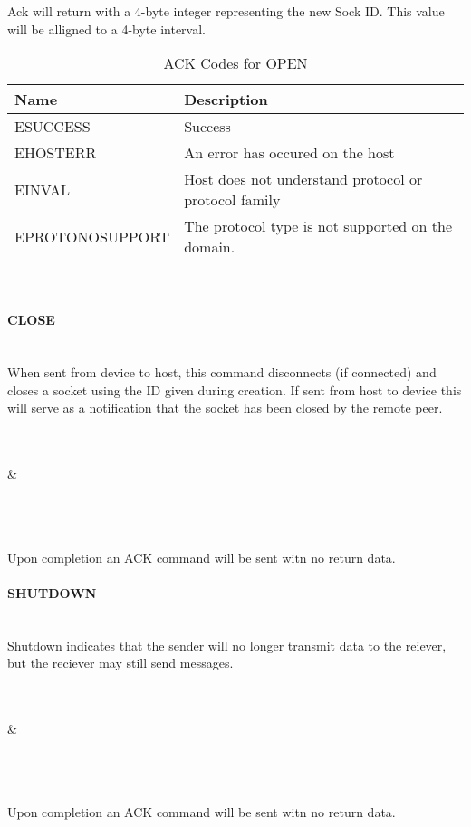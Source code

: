 \documentclass[10pt]{article}
\begin{document}
	Ack will return with a 4-byte integer representing the new Sock ID. This value will be alligned to a 4-byte interval. 
	\begin{table}[H]
		\begin{center}
			\caption{ACK Codes for OPEN}
			\label{tab:openErrTable}
			\begin{tabular}{l|l} 
				\rowcolor{lightgray}
				\textbf{Name} & \textbf{Description}\\
				\hline
				ESUCCESS & Success\\
				EHOSTERR & An error has occured on the host\\
				EINVAL & Host does not understand protocol or protocol family\\
				EPROTONOSUPPORT & The protocol type is not supported on the domain. \\
			\end{tabular}
		\end{center}
	\end{table} \mbox{}\\
	\paragraph{CLOSE} \mbox{}\\
	When sent from device to host, this command disconnects (if connected) and closes a socket using the ID given during creation.
	If sent from host to device this will serve as a notification that the socket has been closed by the remote peer. \\
	\\
	\begin{bytefield}[bitwidth=1.7em]{32}
		 \\
		 &
		 \\
		 \\
		 \\
	\end{bytefield}\\
	Upon completion an ACK command will be sent witn no return data. 
	\\
	\paragraph{SHUTDOWN} \mbox{}\\
	Shutdown indicates that the sender will no longer transmit data to the reiever, but the reciever may still send messages.\\
	\\
	\begin{bytefield}[bitwidth=1.7em]{32}
		 \\
		 &
		 \\
		 \\
		 \\
	\end{bytefield}\\
	Upon completion an ACK command will be sent witn no return data. 
	\\
\end{document}
